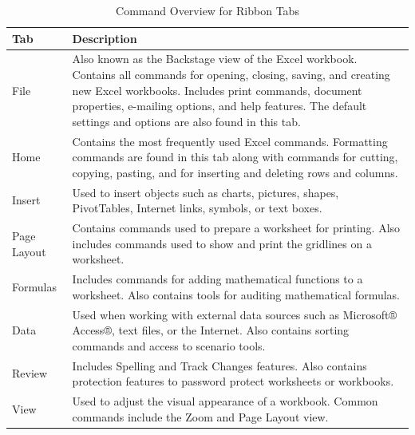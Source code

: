 \begin{table}[H]
	\centering
	\begin{tabularx}{0.95\linewidth}{
			p{0.15\linewidth}
			p{0.85\linewidth}}
		\toprule
		\textbf{Tab} & \textbf{Description} \\
		\midrule

		File & Also known as the Backstage view of the Excel workbook. Contains all commands for opening, closing, saving, and creating new Excel workbooks. Includes print commands, document properties, e-mailing options, and help features. The default settings and options are also found in this tab.\\

		Home & Contains the most frequently used Excel commands. Formatting commands are found in this tab along with commands for cutting, copying, pasting, and for inserting and deleting rows and columns.\\

		Insert & Used to insert objects such as charts, pictures, shapes, PivotTables, Internet links, symbols, or text boxes.\\
		
		Page Layout & Contains commands used to prepare a worksheet for printing. Also includes commands used to show and print the gridlines on a worksheet.\\
		
		Formulas & Includes commands for adding mathematical functions to a worksheet. Also contains tools for auditing mathematical formulas.\\

		Data & Used when working with external data sources such as Microsoft® Access®, text files, or the Internet. Also contains sorting commands and access to scenario tools.\\
		
		Review & Includes Spelling and Track Changes features. Also contains protection features to password protect worksheets or workbooks.\\
		
		View & Used to adjust the visual appearance of a workbook. Common commands include the Zoom and Page Layout view.\\
		
		\bottomrule
	\end{tabularx}
	\caption{Command Overview for Ribbon Tabs}
	\label{01:tab01}
\end{table}

